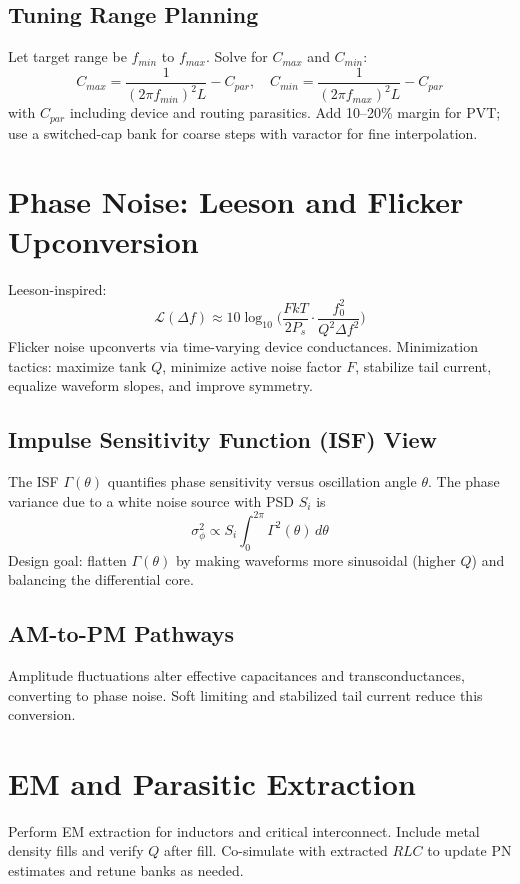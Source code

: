 \subsection*{Tuning Range Planning}
Let target range be \(f_{min}\) to \(f_{max}\). Solve for \(C_{max}\) and \(C_{min}\):
\[
 C_{max} = \frac{1}{(2\pi f_{min})^2 L} - C_{par},\quad C_{min} = \frac{1}{(2\pi f_{max})^2 L} - C_{par}
\]
with \(C_{par}\) including device and routing parasitics. Add 10–20\% margin for PVT; use a switched-cap bank for coarse steps with varactor for fine interpolation.

\section{Phase Noise: Leeson and Flicker Upconversion}
Leeson-inspired:
\[
 \mathcal{L}(\Delta f) \approx 10\log_{10}\!\Bigg( \frac{F k T}{2 P_s} \cdot \frac{f_0^2}{Q^2 \Delta f^2} \Bigg)
\]
Flicker noise upconverts via time-varying device conductances. Minimization tactics: maximize tank \(Q\), minimize active noise factor \(F\), stabilize tail current, equalize waveform slopes, and improve symmetry.

\subsection*{Impulse Sensitivity Function (ISF) View}
The ISF $\Gamma(\theta)$ quantifies phase sensitivity versus oscillation angle $\theta$. The phase variance due to a white noise source with PSD $S_i$ is
\[
 \sigma_\phi^2 \propto S_i \int_0^{2\pi} \Gamma^2(\theta)\, d\theta
\]
Design goal: flatten $\Gamma(\theta)$ by making waveforms more sinusoidal (higher $Q$) and balancing the differential core.

\subsection*{AM-to-PM Pathways}
Amplitude fluctuations alter effective capacitances and transconductances, converting to phase noise. Soft limiting and stabilized tail current reduce this conversion.

\section{EM and Parasitic Extraction}
Perform EM extraction for inductors and critical interconnect. Include metal density fills and verify $Q$ after fill. Co-simulate with extracted \(RLC\) to update PN estimates and retune banks as needed.

